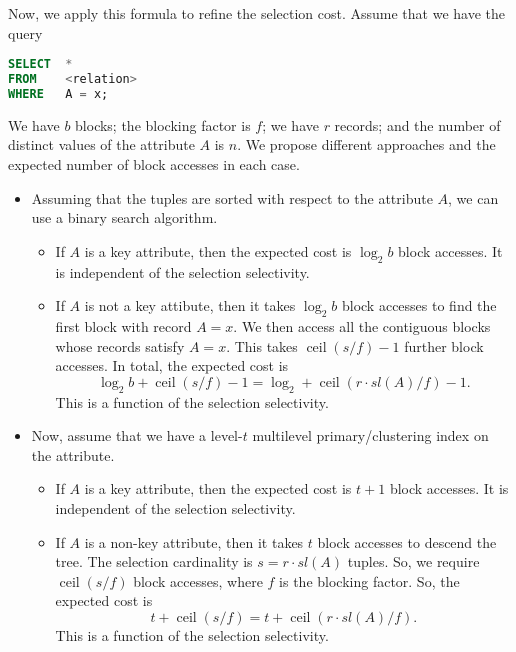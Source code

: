 \documentclass[a4paper, openany]{memoir}
\theoremstyle{definition}
\theoremstyle{plain}
\begin{document}
Now, we apply this formula to refine the selection cost. Assume that we have the query
\begin{lstlisting}[language=SQL]
SELECT  *
FROM    <relation>
WHERE   A = x;
\end{lstlisting}
We have $b$ blocks; the blocking factor is $f$; we have $r$ records; and the number of distinct values of the attribute $A$ is $n$. We propose different approaches and the expected number of block accesses in each case.
\begin{itemize}
    \item Assuming that the tuples are sorted with respect to the attribute $A$, we can use a binary search algorithm. 
    \begin{itemize}
        \item If $A$ is a key attribute, then the expected cost is $\log_2 b$ block accesses. It is independent of the selection selectivity.
        \item If $A$ is not a key attibute, then it takes $\log_2 b$ block accesses to find the first block with record $A = x$. We then access all the contiguous blocks whose records satisfy $A = x$. This takes $\operatorname{ceil}(s/f) - 1$ further block accesses. In total, the expected cost is
        \[\log_2 b + \operatorname{ceil}(s/f) - 1 = \log_2 + \operatorname{ceil}(r \cdot \textit{sl}(A)/f) - 1.\]
        This is a function of the selection selectivity.
    \end{itemize}

    \item Now, assume that we have a level-$t$ multilevel primary/clustering index on the attribute.
    \begin{itemize}
        \item If $A$ is a key attribute, then the expected cost is $t + 1$ block accesses. It is independent of the selection selectivity.
        \item If $A$ is a non-key attribute, then it takes $t$ block accesses to descend the tree. The selection cardinality is $s = r \cdot \textit{sl}(A)$ tuples. So, we require $\operatorname{ceil}(s/f)$ block accesses, where $f$ is the blocking factor. So, the expected cost is
        \[t + \operatorname{ceil}(s/f) = t + \operatorname{ceil}(r \cdot \textit{sl}(A)/f).\]
        This is a function of the selection selectivity.
    \end{itemize}


\end{itemize}
\end{document}
